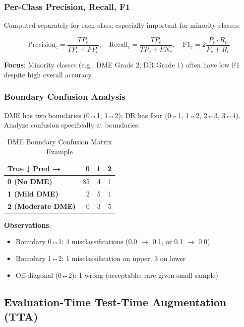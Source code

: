 \subsubsection{Per-Class Precision, Recall, F1}

Computed separately for each class; especially important for minority classes:

\begin{equation}
\text{Precision}_c = \frac{TP_c}{TP_c + FP_c}, \quad
\text{Recall}_c = \frac{TP_c}{TP_c + FN_c}, \quad
\text{F1}_c = 2 \frac{P_c \cdot R_c}{P_c + R_c}
\end{equation}

\textbf{Focus}: Minority classes (e.g., DME Grade 2, DR Grade 1) often have low F1 despite high overall accuracy.

\subsubsection{Boundary Confusion Analysis}

DME has two boundaries (0↔1, 1↔2); DR has four (0↔1, 1↔2, 2↔3, 3↔4). Analyze confusion specifically at boundaries:

\begin{table}[H]
\centering
\small
\caption{DME Boundary Confusion Matrix Example}
\begin{tabular}{|l|r|r|r|}
\hline
\textbf{True ↓     Pred →} & \textbf{0} & \textbf{1} & \textbf{2} \\
\hline
\textbf{0 (No DME)} & 85 & 4 & 1 \\
\textbf{1 (Mild DME)} & 2 & 5 & 1 \\
\textbf{2 (Moderate DME)} & 0 & 3 & 5 \\
\hline
\end{tabular}
\end{table}

\textbf{Observations}:
\begin{itemize}
    \item Boundary 0↔1: 4 misclassifications (0.0 $\to$ 0.1, or 0.1 $\to$ 0.0)
    \item Boundary 1↔2: 1 misclassification on upper, 3 on lower
    \item Off-diagonal (0↔2): 1 wrong (acceptable; rare given small sample)
\end{itemize}

\subsection{Evaluation-Time Test-Time Augmentation (TTA)}

